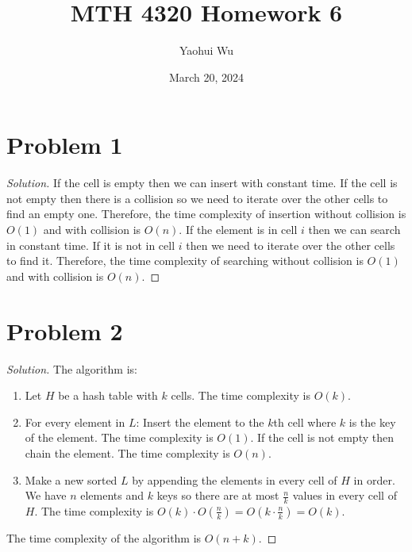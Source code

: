 \documentclass[12pt]{article}
\title{MTH 4320 Homework 6}
\author{Yaohui Wu}
\date{March 20, 2024}
\newenvironment*{solution}{\begin{proof}[Solution]}{\end{proof}}
\begin{document}
\maketitle
\section*{Problem 1}
\begin{solution}
    If the cell is empty then we can insert with constant time. If the cell is
    not empty then there is a collision so we need to iterate over the other
    cells to find an empty one. Therefore, the time complexity of insertion
    without collision is \(O(1)\) and with collision is \(O(n)\). If the
    element is in cell \(i\) then we can search in constant time. If it is not
    in cell \(i\) then we need to iterate over the other cells to find it.
    Therefore, the time complexity of searching without collision is \(O(1)\)
    and with collision is \(O(n)\).
\end{solution}
\section*{Problem 2}
\begin{solution}
    The algorithm is:
    \begin{enumerate}
        \item Let \(H\) be a hash table with \(k\) cells. The time complexity
        is \(O(k)\).
        \item For every element in \(L\): Insert the element to the \(k\)th
        cell where \(k\) is the key of the element. The time complexity is
        \(O(1)\). If the cell is not empty then chain the element. The time
        complexity is \(O(n)\).
        \item Make a new sorted \(L\) by appending the elements in every cell
        of \(H\) in order. We have \(n\) elements and \(k\) keys so there are
        at most \(\frac{n}{k}\) values in every cell of \(H\). The time
        complexity is \(O(k)\cdot O(\frac{n}{k})=O(k\cdot\frac{n}{k})=O(k)\).
    \end{enumerate}
    The time complexity of the algorithm is \(O(n+k)\).
\end{solution}
\end{document}
